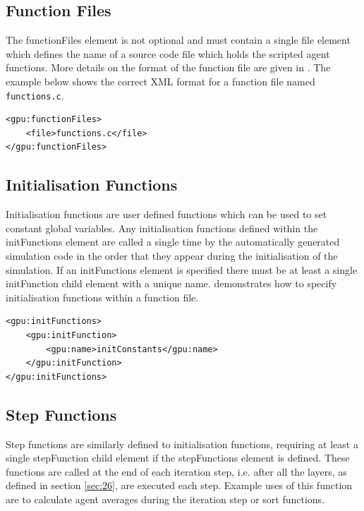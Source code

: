 \documentclass[11pt, a4paper, onecolumn, oneside]{report}
\begin{document}
\subsection{Function Files}
\label{sec:222}


The functionFiles element is not optional and must contain a single file element which defines the name of a source code file which holds the scripted agent functions.
More details on the format of the function file are given in .
The example below shows the correct XML format for a function file named \texttt{functions.c}.

\begin{verbatim}
<gpu:functionFiles>
    <file>functions.c</file>
</gpu:functionFiles>
\end{verbatim}

\subsection{Initialisation Functions}
\label{sec:223}


Initialisation functions are user defined functions which can be used to set constant global variables. 
Any initialisation functions defined within the initFunctions element are called a single time by the automatically generated simulation code in the order that they appear during the initialisation of the simulation. 
If an initFunctions element is specified there must be at least a single initFunction child element with a unique name. 
 demonstrates how to specify initialisation functions within a function file.

\begin{verbatim}
<gpu:initFunctions>
    <gpu:initFunction>
        <gpu:name>initConstants</gpu:name>
    </gpu:initFunction>
</gpu:initFunctions>
\end{verbatim}


\subsection{Step Functions}
\label{sec:stepFunc}

Step functions are similarly defined to initialisation functions, requiring at least a single stepFunction child element if the stepFunctions element is defined. These functions are called at the end of each iteration step, i.e. after all the layers, as defined in section \ref{sec:26}, are executed each step. Example uses of this function are to calculate agent averages during the iteration step or sort functions.
\end{document}
